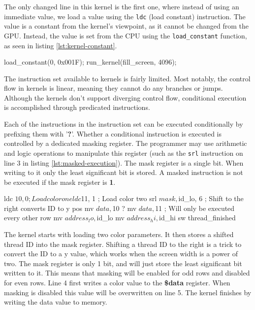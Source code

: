 \documentclass[../main/report.tex]{subfiles}
\begin{document}
The only changed line in this kernel is the first one,
where instead of using an immediate value, we load a value using the \verb/ldc/ (load constant) instruction.
The value is a constant from the kernel's viewpoint, as it cannot be changed from the GPU.
Instead, the value is set from the CPU using the \verb/load_constant/ function,
as seen in listing \ref{lst:kernel-constant}.

\begin{c-code}[caption=Now drawing a blue screen using parameters, label=lst:kernel-constant]
load_constant(0, 0x001F);
run_kernel(fill_screen, 4096);
\end{c-code}

The instruction set available to kernels is fairly limited.
Most notably, the control flow in kernels is linear, meaning they cannot do any branches or jumps.
Although the kernels don't support diverging control flow,
conditional execution is accomplished through predicated instructions.

Each of the instructions in the instruction set can be executed conditionally by prefixing them with '\textbf{?}'.
Whether a conditional instruction is executed is controlled by a dedicated masking register.
The programmer may use arithmetic and logic operations to manipulate this register (such as the \verb/srl/ instruction on line 3 in listing \ref{lst:masked-execution}).
The mask register is a single bit. When writing to it only the least significant bit is stored.
A masked instruction is not be executed if the mask register is \textbf{1}.

\begin{assembly}[caption=Conditional execution using predicated instructions, label=lst:masked-execution]
ldc $10, 0 ; Load color one
ldc $11, 1 ; Load color two
srl $mask, $id_lo, 6 ; Shift to the right converts ID to y pos
mv $data, $10 
? mv $data, $11 ; Will only be executed every other row
mv $address_lo, $id_lo
mv $address_hi, $id_hi
sw
thread_finished
\end{assembly}

The kernel starts with loading two color parameters.
It then stores a shifted thread ID into the mask register.
Shifting a thread ID to the right is a trick to convert the ID to a y value,
which works when the screen width is a power of two.
The mask register is only 1 bit, and will just store the least significant bit written to it.
This means that masking will be enabled for odd rows and disabled for even rows.
Line 4 first writes a color value to the \textbf{\$data} register.
When masking is disabled this value will be overwritten on line 5.
The kernel finishes by writing the data value to memory.

\end{document}
